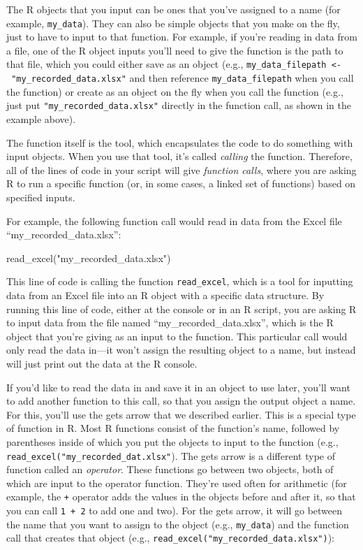 \documentclass[]{tufte-book}
\newenvironment{Shaded}{}{}
\newcommand{\FunctionTok}[1]{\textcolor[rgb]{0.02,0.16,0.49}{#1}}
\newcommand{\NormalTok}[1]{#1}
\newcommand{\StringTok}[1]{\textcolor[rgb]{0.25,0.44,0.63}{#1}}
\begin{document}
The R objects that you input can be ones that you've assigned to a name (for
example, \texttt{my\_data}). They can also be simple objects that you make on the fly,
just to have to input to that function. For example, if you're reading in data
from a file, one of the R object inputs you'll need to give the function is the
path to that file, which you could either save as an object (e.g.,
\texttt{my\_data\_filepath\ \textless{}-\ "my\_recorded\_data.xlsx"} and then reference
\texttt{my\_data\_filepath} when you call the function) or create as an object on the fly
when you call the function (e.g., just put \texttt{"my\_recorded\_data.xlsx"} directly in
the function call, as shown in the example above).

The function itself is the tool, which encapsulates the code to do something with
input objects. When you use that tool, it's called \emph{calling} the function. Therefore,
all of the lines of code in your script will give \emph{function calls}, where you are
asking R to run a specific function (or, in some cases, a linked set of functions)
based on specified inputs.

For example, the following function call would read in data from the Excel file
``my\_recorded\_data.xlsx'':

\begin{Shaded}
\begin{Highlighting}[]
\FunctionTok{read\_excel}\NormalTok{(}\StringTok{"my\_recorded\_data.xlsx"}\NormalTok{)}
\end{Highlighting}
\end{Shaded}

This line of code is calling the function \texttt{read\_excel}, which is a tool for inputting
data from an Excel file into an R object with a specific data structure. By running
this line of code, either at the console or in an R script, you are asking R to input
data from the file named ``my\_recorded\_data.xlsx'', which is the R object that you're
giving as an input to the function. This particular call would only read the data in---it
won't assign the resulting object to a name, but instead will just print out the data
at the R console.

If you'd like to read the data in and save it in an object to use later, you'll
want to add another function to this call, so that you assign the output object
a name. For this, you'll use the gets arrow that we described earlier. This is a
special type of function in R. Most R functions consist of the function's name,
followed by parentheses inside of which you put the objects to input to the
function (e.g., \texttt{read\_excel("my\_recorded\_dat.xlsx"}). The gets arrow is a
different type of function called an \emph{operator}. These functions go between two
objects, both of which are input to the operator function. They're used often
for arithmetic (for example, the \texttt{+} operator adds the values in the objects
before and after it, so that you can call \texttt{1\ +\ 2} to add one and two). For the
gets arrow, it will go between the name that you want to assign to the object
(e.g., \texttt{my\_data}) and the function call that creates that object (e.g.,
\texttt{read\_excel("my\_recorded\_data.xlsx")}):
\end{document}
